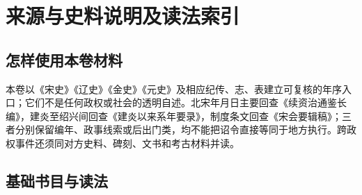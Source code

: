 \chapter{来源与史料说明及读法索引}
\label{app:sources}

\section{怎样使用本卷材料}

本卷以《宋史》《辽史》《金史》《元史》及相应纪传、志、表建立可复核的年序入口；它们不是任何政权或社会的透明自述。北宋年月日主要回查《续资治通鉴长编》，建炎至绍兴间回查《建炎以来系年要录》，制度条文回查《宋会要辑稿》；三者分别保留编年、政事线索或后出门类，均不能把诏令直接等同于地方执行。跨政权事件还须同对方史料、碑刻、文书和考古材料并读。

\section{基础书目与读法}
